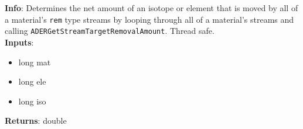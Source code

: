 \textbf{Info}: Determines the net amount of an isotope or element that is moved
by all of a material's \texttt{rem} type streams by looping through all of a
material's streams and calling \texttt{ADERGetStreamTargetRemovalAmount}.
Thread safe. \\

\noindent \textbf{Inputs}:
\begin{itemize}
\item{long mat}
\item{long ele}
\item{long iso}
\end{itemize}

\noindent \textbf{Returns}: double
